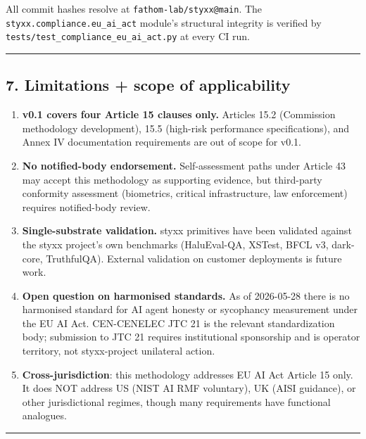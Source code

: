 \documentclass[
]{article}
\providecommand{\tightlist}{%
  \setlength{\itemsep}{0pt}\setlength{\parskip}{0pt}}
\begin{document}
All commit hashes resolve at \texttt{fathom-lab/styxx@main}. The
\texttt{styxx.compliance.eu\_ai\_act} module's structural integrity is
verified by \texttt{tests/test\_compliance\_eu\_ai\_act.py} at every CI
run.

\begin{center}\rule{0.5\linewidth}{0.5pt}\end{center}

\subsection{7. Limitations + scope of
applicability}\label{limitations-scope-of-applicability}

\begin{enumerate}
\def\labelenumi{\arabic{enumi}.}
\tightlist
\item
  \textbf{v0.1 covers four Article 15 clauses only.} Articles 15.2
  (Commission methodology development), 15.5 (high-risk performance
  specifications), and Annex IV documentation requirements are out of
  scope for v0.1.
\item
  \textbf{No notified-body endorsement.} Self-assessment paths under
  Article 43 may accept this methodology as supporting evidence, but
  third-party conformity assessment (biometrics, critical
  infrastructure, law enforcement) requires notified-body review.
\item
  \textbf{Single-substrate validation.} styxx primitives have been
  validated against the styxx project's own benchmarks (HaluEval-QA,
  XSTest, BFCL v3, dark-core, TruthfulQA). External validation on
  customer deployments is future work.
\item
  \textbf{Open question on harmonised standards.} As of 2026-05-28 there
  is no harmonised standard for AI agent honesty or sycophancy
  measurement under the EU AI Act. CEN-CENELEC JTC 21 is the relevant
  standardization body; submission to JTC 21 requires institutional
  sponsorship and is operator territory, not styxx-project unilateral
  action.
\item
  \textbf{Cross-jurisdiction}: this methodology addresses EU AI Act
  Article 15 only. It does NOT address US (NIST AI RMF voluntary), UK
  (AISI guidance), or other jurisdictional regimes, though many
  requirements have functional analogues.
\end{enumerate}

\begin{center}\rule{0.5\linewidth}{0.5pt}\end{center}
\end{document}
